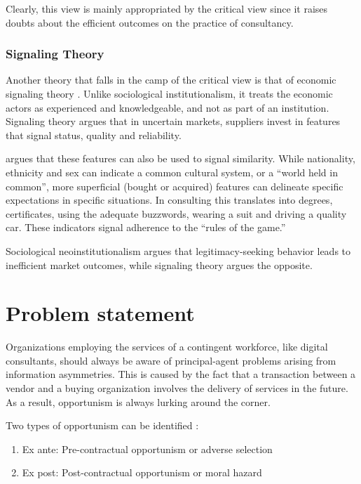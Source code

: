 \documentclass[12pt]{article}
\providecommand{\tightlist}{%
  \setlength{\itemsep}{0pt}\setlength{\parskip}{0pt}}
\begin{document}
Clearly, this view is mainly appropriated by the critical view since it
raises doubts about the efficient outcomes on the practice of
consultancy.

\hypertarget{signaling-theory}{%
\subsubsection{Signaling Theory}\label{signaling-theory}}

Another theory that falls in the camp of the critical view is that of
economic signaling theory \citep[ 8-10]{armbruster2006}. Unlike
sociological institutionalism, it treats the economic actors as
experienced and knowledgeable, and not as part of an institution.
Signaling theory argues that in uncertain markets, suppliers invest in
features that signal status, quality and reliability.

\citet[15-16]{zucker1985} argues that these features can also be used to
signal similarity. While nationality, ethnicity and sex can indicate a
common cultural system, or a ``world held in common'', more superficial
(bought or acquired) features can delineate specific expectations in
specific situations. In consulting this translates into degrees,
certificates, using the adequate buzzwords, wearing a suit and driving a
quality car. These indicators signal adherence to the ``rules of the
game.''

Sociological neoinstitutionalism argues that legitimacy-seeking behavior
leads to inefficient market outcomes, while signaling theory argues the
opposite.

\hypertarget{problem-statement}{%
\section{Problem statement}\label{problem-statement}}

Organizations employing the services of a contingent workforce, like
digital consultants, should always be aware of principal-agent problems
arising from information asymmetries. This is caused by the fact that a
transaction between a vendor and a buying organization involves the
delivery of services in the future. As a result, opportunism is always
lurking around the corner.

Two types of opportunism can be identified \citet[242]{clark1993}:

\begin{enumerate}
\def\labelenumi{\arabic{enumi}.}
\tightlist
\item
  Ex ante: Pre-contractual opportunism or adverse selection
\item
  Ex post: Post-contractual opportunism or moral hazard
\end{enumerate}
\end{document}
